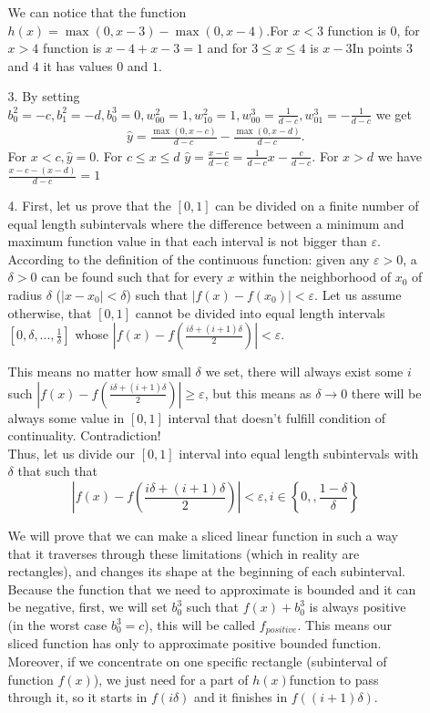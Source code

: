 \documentclass[10pt,a4paper]{article}
\begin{document}
\begin{enumerate}
\begin{enumerate}
We can notice that the function 
$h(x) = \max(0, x-3) - \max(0, x - 4)$.For $x<3$ function is 0, for $x> 4$ function is $x-4 + x-3 = 1$ and for $3\leq x\leq4$  is $x-3$In points $3$ and $4$ it has values $0$ and $1$.
\item[3.]
By setting $b_0^2=-c, b_1^2=-d, b_0^3=0, w_{00}^2=1, w_{10}^2=1, w_{00}^3=\frac{1}{d-c}, w_{01}^3=-\frac{1}{d-c}$ we get 
\begin{align*}
\hat{y} = \frac{\max(0, x-c)}{d-c} - \frac{\max(0, x-d)}{d-c}.
\end{align*} 
For $x<c, \hat{y}=0$. 
For $c\leq x\leq d$ $\hat{y}=\frac{x-c}{d-c}=\frac{1}{d-c}x - \frac{c}{d-c}$. For $x > d$ we have $\frac{x-c - (x - d)}{d-c}=1$
\item[4.]
First, let us prove that the $[0, 1]$ can be divided on a finite number of equal length subintervals where the difference between a minimum and maximum function value in that each interval is not bigger than $\varepsilon$.\\

According to the definition of the continuous function: given any $\varepsilon>0$, a $\delta>0$ can be found such that for every $x$ within the neighborhood of $x_0$ of radius $\delta$ ($|x-x_0|<\delta$) such that $|f(x)-f(x_0)|<\varepsilon$. 
Let us assume otherwise, that  $[0,1]$ cannot be divided into equal length intervals $[0, \delta, ..., \frac{1}{\delta}]$
whose $|f(x)-f(\frac{i\delta + (i+1)\delta}{2})|<\varepsilon$. 

This means no matter how small $\delta$ we set, there will always exist some $i$ such $|f(x)-f(\frac{i\delta + (i+1)\delta}{2})|\geq \varepsilon$, but this means as $\delta \rightarrow 0$ there will be always some value in $[0,1]$ interval that doesn't fulfill condition of continuality. Contradiction! \\
Thus, let us divide our $[0,1]$ interval into equal length subintervals with $\delta$ that such that   $$\left|f(x)-f\left(\frac{i\delta + (i+1)\delta}{2}\right)\right|<\varepsilon, i \in \left\{ 0, , \frac{1-\delta}{\delta}\right\}$$

We will prove that we can make a sliced linear function in such a way that it traverses through these limitations (which in reality are rectangles), and changes its shape at the beginning of each subinterval.
Because the function that we need to approximate is bounded and it can be negative, first, we will set $b_0^3$ such that $f(x)+b_0^3$ is always positive (in the worst case $b_0^3 = c$), this will be called $f_{positive}$. This means our sliced function has only to approximate positive bounded function. Moreover, if we concentrate on one specific rectangle (subinterval of function $f(x)$), we just need for a part of $h(x)$function to pass through it, so it starts in $f(i\delta)$ and it finishes in $f((i+1)\delta)$. 


\end{enumerate}
\end{enumerate}
\end{document}
